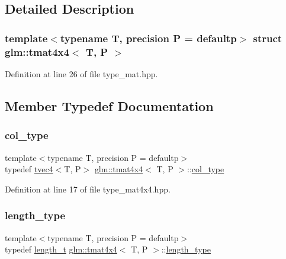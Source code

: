 \subsection{Detailed Description}
\subsubsection*{template$<$typename T, precision P = defaultp$>$\newline
struct glm\+::tmat4x4$<$ T, P $>$}



Definition at line 26 of file type\+\_\+mat.\+hpp.



\subsection{Member Typedef Documentation}
\mbox{\label{structglm_1_1tmat4x4_ac879ae9669b754551245231ee992a1ea}} 
\subsubsection{\texorpdfstring{col\_type}{col\_type}}
{\footnotesize\ttfamily template$<$typename T, precision P = defaultp$>$ \\
typedef \mbox{\hyperlink{structglm_1_1tvec4}{tvec4}}$<$T, P$>$ \mbox{\hyperlink{structglm_1_1tmat4x4}{glm\+::tmat4x4}}$<$ T, P $>$\+::\mbox{\hyperlink{structglm_1_1tmat4x4_ac879ae9669b754551245231ee992a1ea}{col\+\_\+type}}}



Definition at line 17 of file type\+\_\+mat4x4.\+hpp.

\mbox{\label{structglm_1_1tmat4x4_aff2734210dc0f3c3c60c49bb1f3e8864}} 
\subsubsection{\texorpdfstring{length\_type}{length\_type}}
{\footnotesize\ttfamily template$<$typename T, precision P = defaultp$>$ \\
typedef \mbox{\hyperlink{namespaceglm_a090a0de2260835bee80e71a702492ed9}{length\+\_\+t}} \mbox{\hyperlink{structglm_1_1tmat4x4}{glm\+::tmat4x4}}$<$ T, P $>$\+::\mbox{\hyperlink{structglm_1_1tmat4x4_aff2734210dc0f3c3c60c49bb1f3e8864}{length\+\_\+type}}}




